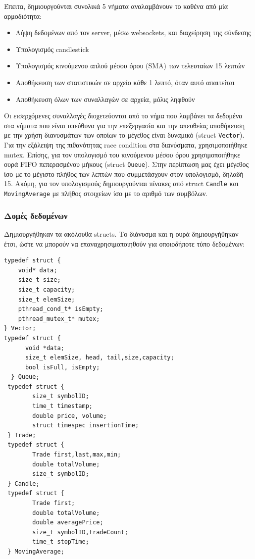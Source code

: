 \documentclass[11pt]{article}
\begin{document}
Έπειτα, δημιουργούνται συνολικά 5 νήματα αναλαμβάνουν το καθένα από μία αρμοδιότητα:
\begin{itemize}
\item Λήψη δεδομένων από τον server, μέσω websockets, και διαχείρηση της σύνδεσης
\item Υπολογισμός candlestick
\item Υπολογισμός κινούμενου απλού μέσου όρου (SMA) των τελευταίων 15 λεπτών
\item Αποθήκευση των στατιστικών σε αρχείο κάθε 1 λεπτό, όταν αυτό απαιτείται
\item Αποθήκευση όλων των συναλλαγών σε αρχεία, μόλις ληφθούν
\end{itemize}

Οι εισερχόμενες συναλλαγές διοχετεύονται από το νήμα που λαμβάνει τα δεδομένα στα νήματα που είναι υπεύθυνα για την επεξεργασία και την απευθείας αποθήκευση με την χρήση διανυσμάτων των οποίων το μέγεθος είναι δυναμικό (struct \texttt{Vector}). Για την εξάλειψη της πιθανότητας race condition στα διανύσματα, χρησιμοποιήθηκε mutex. Επίσης, για τον υπολογισμό του κινούμενου μέσου όρου χρησιμοποιήθηκε ουρά FIFO πεπερασμένου μήκους (struct \texttt{Queue}). Στην περίπτωση μας έχει μέγεθος ίσο με το μέγιστο πλήθος των λεπτών που συμμετάσχουν στον υπολογισμό, δηλαδή 15. Ακόμη, για τον υπολογισμούς δημιουργούνται πίνακες από struct \texttt{Candle} και \texttt{MovingAverage} με πλήθος στοιχείων ίσο με το αριθμό των συμβόλων.

\subsubsection{Δομές δεδομένων}
\label{sec:org2958d81}
Δημιουργήθηκαν τα ακόλουθα structs. Το διάνυσμα και η ουρά δημιουργήθηκαν έτσι, ώστε να μπορούν να επαναχρησιμοποιηθούν για οποιοδήποτε τύπο δεδομένων:
\begin{verbatim}
typedef struct {
    void* data;
    size_t size;
    size_t capacity;
    size_t elemSize;
    pthread_cond_t* isEmpty;
    pthread_mutex_t* mutex;
} Vector;
typedef struct {
      void *data;
      size_t elemSize, head, tail,size,capacity;
      bool isFull, isEmpty;
  } Queue;
 typedef struct {
        size_t symbolID;
        time_t timestamp;
        double price, volume;
        struct timespec insertionTime;
 } Trade;
 typedef struct {
        Trade first,last,max,min;
        double totalVolume;
        size_t symbolID;
 } Candle;
 typedef struct {
        Trade first;
        double totalVolume;
        double averagePrice;
        size_t symbolID,tradeCount;
        time_t stopTime;
 } MovingAverage;
\end{verbatim}
\end{document}
